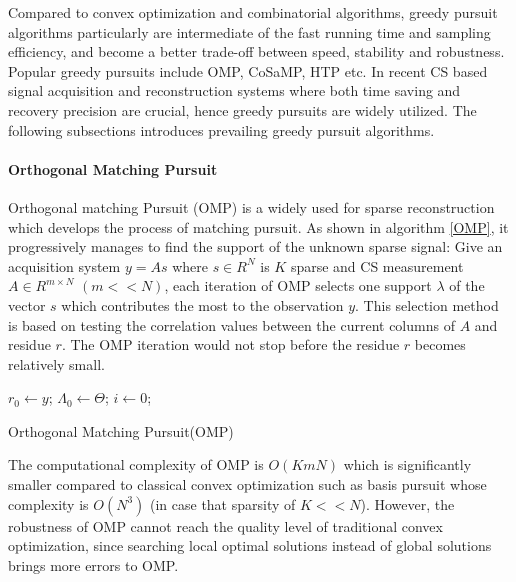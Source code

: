 Compared to convex optimization and combinatorial algorithms, greedy pursuit algorithms particularly are intermediate of the fast running time and sampling efficiency, and become a better trade-off between speed, stability and robustness. Popular greedy pursuits include OMP\cite{pati1993orthogonal}, CoSaMP\cite{needell2009cosamp}, HTP\cite{blumensath2009iterative} etc. In recent CS based signal acquisition and reconstruction systems where both time saving and recovery precision are crucial, hence greedy pursuits are widely utilized. The following subsections introduces prevailing greedy pursuit algorithms. 

\paragraph{Orthogonal Matching Pursuit}
Orthogonal matching Pursuit (OMP)\cite{mallat1993matching} is a widely used for sparse reconstruction which develops the process of matching pursuit. As shown in algorithm \ref{OMP}, it progressively manages to find the support of the unknown sparse signal: Give an acquisition system $y = As$ where $s \in R^N$ is $K$ sparse and CS measurement $A \in R^{m \times N}$ $(m << N)$, each iteration of OMP selects one support $\lambda$ of the vector $s$ which contributes the most to the observation $y$. This selection method is based on testing the correlation values between the current columns of $A$ and residue $r$. The OMP iteration would not stop before the residue $r$ becomes relatively small. 

\IncMargin{1em}
\begin{algorithm}
    \BlankLine
	$r_0 \gets y$; $\Lambda_0 \gets \Theta$; $i \gets 0$; \;
\caption{Orthogonal Matching Pursuit(OMP)}\label{OMP}
\end{algorithm}
\DecMargin{1em}

The computational complexity of OMP is $O(KmN)$ which is significantly smaller compared to classical convex optimization such as basis pursuit whose complexity is $O(N^3)$ (in case that sparsity of $K << N$)\cite{dai2009subspace}. However, the robustness of OMP cannot reach the quality level of traditional convex optimization, since searching local optimal solutions instead of global solutions brings more errors to OMP.  

